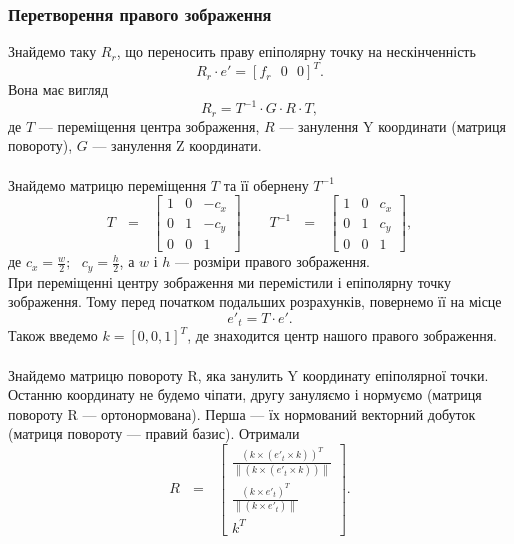 \subsubsection{Перетворення правого зображення}
Знайдемо таку $R_r$, що переносить праву епіполярну точку на нескінченність 
\begin{equation}
	R_r \cdot e' = {[f_r \:\:\: 0 \:\:\: 0]}^T.
\end{equation}
Вона має вигляд 
\begin{equation}
	R_r = T^{-1} \cdot G \cdot R \cdot T,
\end{equation}
де $T$ --- переміщення центра зображення, $R$ --- занулення Y координати 
(матриця повороту), $G$ --- занулення Z координати.
\\\\
Знайдемо матрицю переміщення $T$ та її обернену $T^{-1}$
\begin{equation}
T \:\:\: = \:\:\:\left[
\begin{matrix}
1 & 0 & -c_x\\
0 & 1 & -c_y\\
0 & 0 & 1\
\end{matrix}
\right]
\:\:\:\:\:\:\:\:\:
T^{-1} \:\:\: = \:\:\:\left[
\begin{matrix}
1 & 0 & c_x\\
0 & 1 & c_y\\
0 & 0 & 1\
\end{matrix}
\right],
\end{equation}
де $c_x = \frac{w}{2}; \:\:\: c_y = \frac{h}{2}$, а $w$ і $h$ --- розміри 
правого зображення.
\\
\indent
При переміщенні центру 
зображення ми перемістили і епіполярну точку зображення. Тому перед
початком подальших розрахунків, повернемо її на місце
\begin{equation}
	{e'}_t = T \cdot e'.
\end{equation}
Також введемо $k = {[0, 0, 1]}^T$, де знаходится центр нашого правого 
зображення.
\\\\
\indent
Знайдемо матрицю повороту R, яка занулить Y координату епіполярної точки. 
Останню координату не будемо чіпати, другу зануляємо і нормуємо (матриця  
повороту R --- ортонормована). Перша --- їх нормований векторний добуток 
(матриця повороту --- правий базис). Отримали
\begin{equation}
R \:\:\: = \:\:\:\left[
\begin{matrix}
\frac{{(k \times ({e'}_t \times k))}^T} 
{\left \| (k \times ({e'}_t \times k)) \right \|}\\
\frac{{(k \times {e'}_t)}^T}{\left \| (k \times {e'}_t) \right \|}\\
k^T\
\end{matrix}
\right].
\end{equation}
